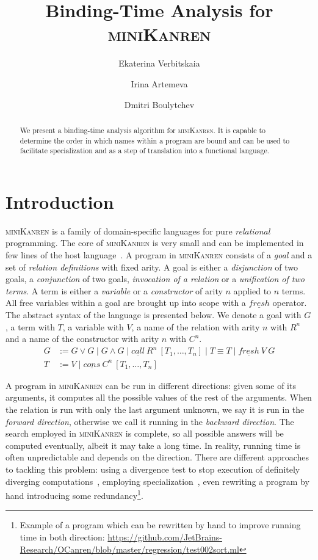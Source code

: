 \documentclass[submission,copyright,creativecommons]{eptcs}
\title{Binding-Time Analysis for \textsc{miniKanren}}
\author{Ekaterina Verbitskaia
\institute{JetBrains Research\\
Saint Petersburg, Russia}
\email{kajigor@gmail.com}
\and
Irina Artemeva
\institute{IFMO University\\
Saint Petersburg, Russia}
\email{irina-pluralia@rambler.ru}
\and
Dmitri Boulytchev
\institute{SPbSU\\
Saint Petersburg, Russia}
\email{dboulytchev@gmail.com}
}
\newcommand{\miniKanren}{\textsc{miniKanren}}
\begin{document}
\maketitle

\begin{abstract}
We present a binding-time analysis algorithm for \miniKanren{}.
It is capable to determine the order in which names within a program are bound and can be used to facilitate specialization and as a step of translation into a functional language.
\end{abstract}

\section{Introduction}

\miniKanren{} is a family of domain-specific languages for pure \emph{relational} programming.
The core of \miniKanren{} is very small and can be implemented in few lines of the host language~\cite{hemann2013ukanren}.
A program in \miniKanren{} consists of a \emph{goal} and a set of \emph{relation definitions} with fixed arity.
A goal is either a \emph{disjunction} of two goals, a \emph{conjunction} of two goals, \emph{invocation of a relation} or a \emph{unification of two terms}.
A term is either a \emph{variable} or a \emph{constructor} of arity $n$ applied to $n$ terms.
All free variables within a goal are brought up into scope with a $\underline{fresh}$ operator.
The abstract syntax of the language is presented below.
We denote a goal with $G$, a term with $T$, a variable with $V$, a name of the relation with arity $n$ with $R^n$ and a name of the constructor with arity $n$ with $C^n$.
\begin{align*}
  G &:= G \vee G \mid G \wedge G \mid \underline{call} \ R^n \ [T_1, \dots, T_n] \mid T \equiv T \mid \underline{fresh} \ V \ G  \\
  T &:= V \mid \underline{cons} \ C^n \  [T_1, \dots, T_n]
\end{align*}

A program in \miniKanren{} can be run in different directions: given some of its arguments, it computes all the possible values of the rest of the arguments.
When the relation is run with only the last argument unknown, we say it is run in the \emph{forward direction}, otherwise we call it running in the \emph{backward direction}.
The search employed in \miniKanren{} is complete, so all possible answers will be computed eventually, albeit it may take a long time.
In reality, running time is often unpredictable and depends on the direction.
There are different approaches to tackling this problem: using a divergence test to stop execution of definitely diverging computations~\cite{rozplokhas2018improving}, employing specialization~\cite{lozov2019relational}, even rewriting a program by hand introducing some redundancy\footnote{Example of a program which can be rewritten by hand to improve running time in both direction: \url{https://github.com/JetBrains-Research/OCanren/blob/master/regression/test002sort.ml}}.
\end{document}
